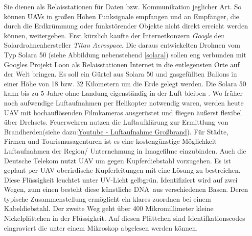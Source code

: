Sie dienen als Relaisstationen für Daten bzw. Kommunikation jeglicher Art. So können \acp{UAV} in großen Höhen Funksignale empfangen und an Empfänger, die durch die Erdkrümmung oder funkstörender Objekte nicht direkt erreicht werden können, weitergeben. Erst kürzlich kaufte der Internetkonzern \textit{Google} den Solardrohnenhersteller \textit{Titan Aerospace}. Die daraus entwickelten Drohnen vom Typ Solara 50 (siehe Abbildung nebenstehend \ref{solara}) sollen eng verbunden mit Googles Projekt Loon als Relaisstationen Internet in die entlegensten Orte auf der Welt bringen. Es soll ein Gürtel aus Solara 50 und gasgefüllten Ballons in einer Höhe von 18 bzw. 32 Kilometern um die Erde gelegt werden. Die Solara 50 kann bis zu 5 Jahre ohne Landung eigenständig in der Luft bleiben \cite{loon}\cite{loon2}.
Wo früher noch aufwendige Luftaufnahmen per Helikopter notwendig waren, werden heute \ac{UAV} mit hochauflösenden Filmkameras ausgerüstet und fliegen äußerst flexibel über Drehsets.
Feuerwehren nutzen die Luftaufklärung zur Ermittlung von Brandherden(siehe dazu:\href{http://youtu.be/_yngOox3oJ4}{Youtube - Luftaufnahme Großbrand}).
Für Städte, Firmen und Tourismusagenturen ist es eine kostengünstige Möglichkeit Luftaufnahmen der Region/ Unternehmung in Imagefilme einzubinden. Auch die Deutsche Telekom nutzt \ac{UAV} um gegen Kupferdiebstahl vorzugehen. Es ist geplant per \ac{UAV} oberirdische Kupferleitungen mit eine Lösung zu bestreichen. Diese Flüssigkeit leuchtet unter \acs{UV-Licht} gelbgrün. Identifiziert wird auf zwei Wegen, zum einen besteht diese künstliche \glqq \acs{DNA}\grqq\ aus verschiedenen Basen. Deren typische Zusammenstellung ermöglicht ein klares zuordnen bei einem Kabeldiebstahl. Der zweite Weg geht über 400 Mikromillimeter kleine Nickelplättchen in der Flüssigkeit. Auf diesen Plättchen sind Identifkationscodes eingraviert die unter einem Mikroskop abgelesen werden können\cite{telekom}.
